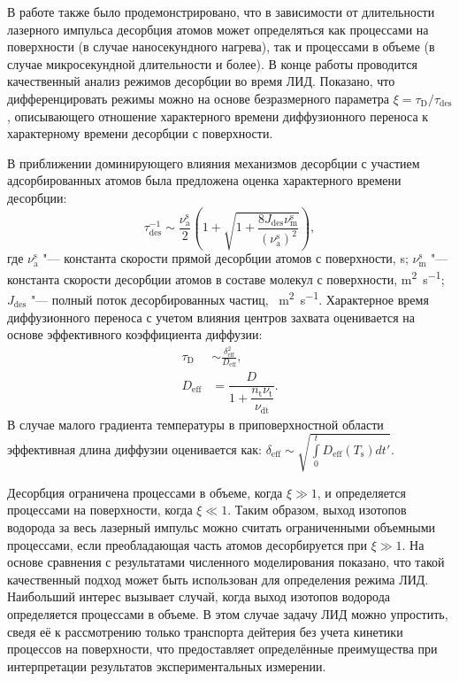 В работе также было продемонстрировано, что в зависимости от длительности лазерного импульса десорбция атомов может определяться как процессами на поверхности (в случае наносекундного нагрева), так и процессами в объеме (в случае микросекундной длительности и более). В конце работы проводится качественный анализ режимов десорбции во время ЛИД. Показано, что дифференцировать режимы можно на основе безразмерного параметра \( \xi=\tau_\mathrm{D}/\tau_\mathrm{des} \), описывающего отношение характерного времени диффузионного переноса к характерному времени десорбции с поверхности. 

В приближении доминирующего влияния механизмов десорбции с участием адсорбированных атомов была предложена оценка характерного времени десорбции:
\begin{equation}
    \tau_\mathrm{des}^{-1} \sim \dfrac{\nu_\mathrm{a}^\mathrm{s}}{2} \left( 1 + \sqrt{1+\dfrac{8J_\mathrm{des}\nu_\mathrm{m}^\mathrm{s}}{(\nu_\mathrm{a}^\mathrm{s})^2}} \right),
\end{equation}
где \( \nu_\mathrm{a}^\mathrm{s} \) "--- константа скорости прямой десорбции атомов с поверхности, \si{\second}; \( \nu_\mathrm{m}^\mathrm{s} \) "--- константа скорости десорбции атомов в составе молекул с поверхности, \si{\meter\squared\per\second}; \( J_\mathrm{des} \) "--- полный поток десорбированных частиц, \si{\per\meter\squared\per\second}. Характерное время диффузионного переноса с учетом влияния центров захвата оценивается на основе эффективного коэффициента диффузии:
\begin{subequations}
    \begin{align}
        \tau_\mathrm{D}         & \sim \frac{\delta_\mathrm{eff}^2}{D_\mathrm{eff}}, \\
        D_\mathrm{eff} & = \dfrac{D}{1+\dfrac{n_\mathrm{t}\nu_\mathrm{t}}{\nu_\mathrm{dt}}}. 
    \end{align}
\end{subequations}
В случае малого градиента температуры в приповерхностной области эффективная длина диффузии оценивается как: \( \delta_\mathrm{eff} \sim \sqrt{\int\limits_0^t D_\mathrm{eff}(T_\mathrm{s})dt'}\). 

Десорбция ограничена процессами в объеме, когда \( \xi \gg 1 \), и определяется процессами на поверхности, когда \( \xi \ll 1 \). Таким образом, выход изотопов водорода за весь лазерный импульс можно считать ограниченными объемными процессами, если преобладающая часть атомов десорбируется при \( \xi \gg 1 \). На основе сравнения с результатами численного моделирования показано, что такой качественный подход может быть использован для определения режима ЛИД. Наибольший интерес вызывает случай, когда выход изотопов водорода определяется процессами в объеме. В этом случае задачу ЛИД можно упростить, сведя её к рассмотрению только транспорта дейтерия без учета кинетики процессов на поверхности, что предоставляет определённые преимущества при интерпретации результатов экспериментальных измерении.

